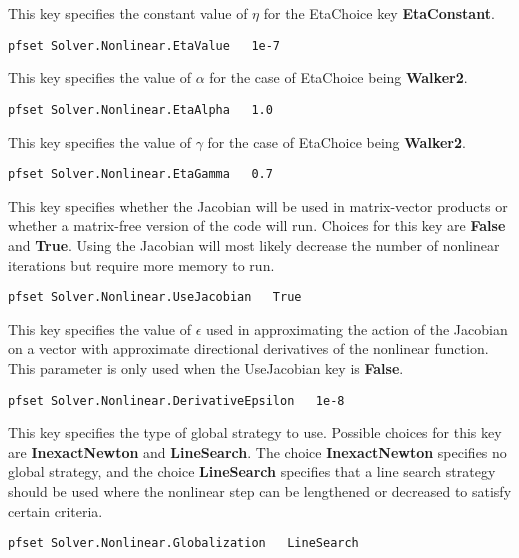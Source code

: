 {This key specifies the constant value of $\eta$ for the EtaChoice key
{\bf EtaConstant}.
}
\begin{display}\begin{verbatim}
pfset Solver.Nonlinear.EtaValue   1e-7
\end{verbatim}\end{display}

{This key specifies the value of $\alpha$ for the case of EtaChoice being
{\bf Walker2}.
}
\begin{display}\begin{verbatim}
pfset Solver.Nonlinear.EtaAlpha   1.0
\end{verbatim}\end{display}

{This key specifies the value of $\gamma$ for the case of EtaChoice being
{\bf Walker2}.
}
\begin{display}\begin{verbatim}
pfset Solver.Nonlinear.EtaGamma   0.7
\end{verbatim}\end{display}

{This key specifies whether the Jacobian will be used in matrix-vector products
or whether a matrix-free version of the code will run.  Choices for this key
are {\bf False} and {\bf True}.
Using the Jacobian will most likely decrease the number of nonlinear iterations
but require more memory to run.
}
\begin{display}\begin{verbatim}
pfset Solver.Nonlinear.UseJacobian   True
\end{verbatim}\end{display}

{This key specifies the value of $\epsilon$ used in approximating the action of
the Jacobian on a vector with approximate directional derivatives of the
nonlinear function.  This parameter is only used when the UseJacobian key is
{\bf False}.
}
\begin{display}\begin{verbatim}
pfset Solver.Nonlinear.DerivativeEpsilon   1e-8
\end{verbatim}\end{display}

{This key specifies the type of global strategy to use.  Possible choices for
this key are {\bf InexactNewton} and {\bf LineSearch}.  The choice {\bf
InexactNewton} specifies no global strategy, and the choice {\bf LineSearch}
specifies that a line search strategy should be used where the nonlinear step
can be lengthened or decreased to satisfy certain criteria.
}
\begin{display}\begin{verbatim}
pfset Solver.Nonlinear.Globalization   LineSearch
\end{verbatim}\end{display}

